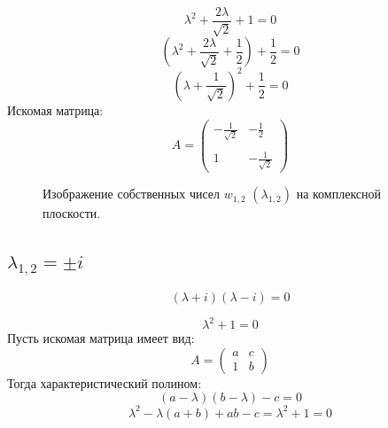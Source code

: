\documentclass[a5paper, 10pt]{article}
\theoremstyle{definition}
\theoremstyle{plain}
\theoremstyle{remark}
\begin{document}
\begin{equation}
  \lambda^2 + \frac{2\lambda}{\sqrt{2}} + 1  =0
\end{equation}
\begin{equation}
 \left( \lambda^2 + \frac{2\lambda}{\sqrt{2}} + \frac{1}{2} \right) + \frac{1}{2}  =0
\end{equation}
\begin{equation}
 \left( \lambda + \frac{1}{\sqrt{2}} \right)^2 + \frac{1}{2}  =0
\end{equation}
Искомая матрица:
\begin{equation}
A =
\begin{pmatrix}
-\frac{1}{\sqrt{2}} & -\frac{1}{2} \\
\\
1 & -\frac{1}{\sqrt{2}}
\end{pmatrix}
\end{equation}

\begin{figure}[h!]
\caption{Изображение собственных чисел $w_{1, 2} \, \, \left( \lambda_{1, 2} \right)$ на комплексной плоскости.}
\end{figure}

\subsection{$\lambda_{1, 2} = \pm i$}

\begin{equation}
\left( \lambda +  i \right)\left( \lambda - i \right)=0
\end{equation}

\begin{equation}
\lambda^2 +  1 =0
\end{equation}
Пусть искомая матрица имеет вид:
\begin{equation}
A =
\begin{pmatrix}
a & c \\
1 & b
\end{pmatrix}
\end{equation}
Тогда характеристический полином:
\begin{equation}
\left( a - \lambda \right) \left( b - \lambda \right) - c = 0
\end{equation}
\begin{equation}
\lambda^ 2 - \lambda (a + b ) + ab - c = \lambda^2 +  1 =0
\end{equation}
\end{document}
